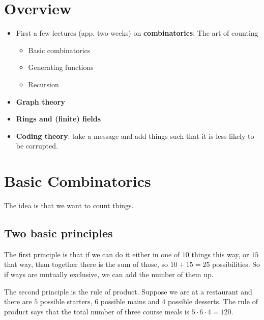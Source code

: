 \documentclass[english]{lbscript}
\begin{document}


\tableofcontents{}

\pagebreak

\section{Overview}
\label{sec:overview}

\begin{itemize}
	\item  First a few lectures (app. two weeks) on \textbf{combinatorics}: The art of counting
	      \begin{itemize}
		      \item Basic combinatorics
		      \item Generating functions
		      \item Recursion
	      \end{itemize}
	\item \textbf{Graph theory} %
	\item \textbf{Rings and (finite) fields}
	\item \textbf{Coding theory}: take a message and add things such that it is less likely to be corrupted.
\end{itemize}


\section{Basic Combinatorics}
\label{sec:basic-combinatorics}

The idea is that we want to count things.

\subsection{Two basic principles}
\label{sec:two-basic-principles}


The first principle is that if we can do it either in one of \(10\) things this way, or \(15\) that way, than together there is the sum of those, so \(10+15=25\) possibilities. So if ways are mutually exclusive, we can add the number of them up.

The second principle is the rule of product. Suppose we are at a restaurant and there are \(5\) possible starters, \(6\) possible mains and \(4\) possible desserts. The rule of product says that  the total number of three course meals is \(5⋅6⋅4=120\).
\end{document}
